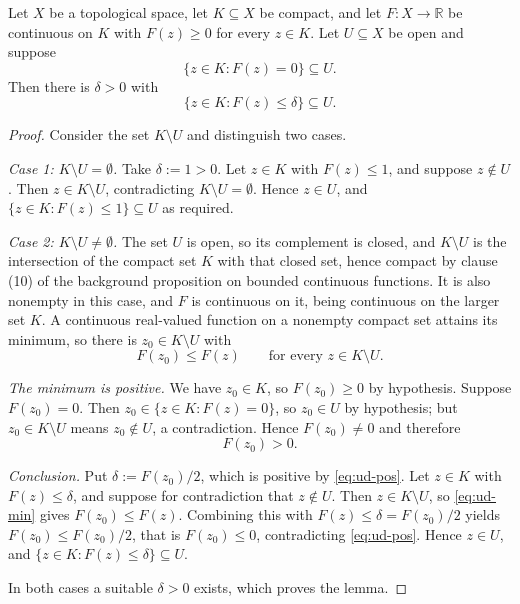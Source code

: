 \begin{lemma}
Let $X$ be a topological space, let $K\subseteq X$ be compact, and let
$F\colon X\to\mathbb{R}$ be continuous on $K$ with $F(z)\ge0$ for every $z\in K$.  Let
$U\subseteq X$ be open and suppose
\[
  \{z\in K:F(z)=0\}\subseteq U .
\]
Then there is $\delta>0$ with
\[
  \{z\in K:F(z)\le\delta\}\subseteq U .
\]
\end{lemma}
\begin{proof}
Consider the set $K\setminus U$ and distinguish two cases.

\medskip\noindent\emph{Case 1: $K\setminus U=\emptyset$.}
Take $\delta:=1>0$.  Let $z\in K$ with $F(z)\le1$, and suppose $z\notin U$.  Then
$z\in K\setminus U$, contradicting $K\setminus U=\emptyset$.  Hence $z\in U$, and
$\{z\in K:F(z)\le1\}\subseteq U$ as required.

\medskip\noindent\emph{Case 2: $K\setminus U\neq\emptyset$.}
The set $U$ is open, so its complement is closed, and $K\setminus U$ is the intersection of the
compact set $K$ with that closed set, hence compact by clause (10) of the background proposition
on bounded continuous functions.  It is also nonempty in this case, and $F$ is continuous on it,
being continuous on the larger set $K$.  A continuous real-valued function on a nonempty compact
set attains its minimum, so there is $z_0\in K\setminus U$ with
\begin{equation}\label{eq:ud-min}
  F(z_0)\le F(z)\qquad\text{for every }z\in K\setminus U .
\end{equation}

\emph{The minimum is positive.}  We have $z_0\in K$, so $F(z_0)\ge0$ by hypothesis.  Suppose
$F(z_0)=0$.  Then $z_0\in\{z\in K:F(z)=0\}$, so $z_0\in U$ by hypothesis; but
$z_0\in K\setminus U$ means $z_0\notin U$, a contradiction.  Hence $F(z_0)\neq0$ and therefore
\begin{equation}\label{eq:ud-pos}
  F(z_0)>0 .
\end{equation}

\emph{Conclusion.}  Put $\delta:=F(z_0)/2$, which is positive by \eqref{eq:ud-pos}.  Let $z\in K$
with $F(z)\le\delta$, and suppose for contradiction that $z\notin U$.  Then
$z\in K\setminus U$, so \eqref{eq:ud-min} gives $F(z_0)\le F(z)$.  Combining this with
$F(z)\le\delta=F(z_0)/2$ yields $F(z_0)\le F(z_0)/2$, that is $F(z_0)\le0$, contradicting
\eqref{eq:ud-pos}.  Hence $z\in U$, and $\{z\in K:F(z)\le\delta\}\subseteq U$.

\medskip\noindent In both cases a suitable $\delta>0$ exists, which proves the lemma.
\end{proof}
